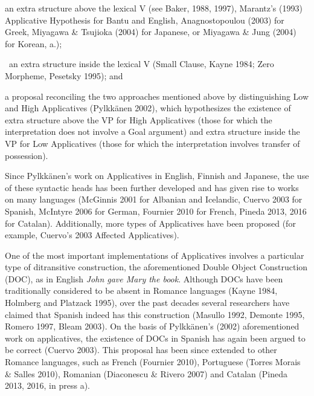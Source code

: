 \setcounter{listWWviiiNumileveli}{0}
\begin{listWWviiiNumileveli}
\item 
\begin{styleBodyA}
an extra structure above the lexical V (see Baker, 1988, 1997), Marantz's (1993) Applicative Hypothesis for Bantu and English, Anagnostopoulou (2003) for Greek, Miyagawa \& Tsujioka (2004) for Japanese, or Miyagawa \& Jung (2004) for Korean, a.); 
\end{styleBodyA}
\item 
\begin{styleBodyA}
\ an extra structure inside the lexical V (Small Clause, Kayne 1984; Zero Morpheme, Pesetsky 1995); and
\end{styleBodyA}
\item 
\begin{styleBodyA}
a proposal reconciling the two approaches mentioned above by distinguishing Low and High Applicatives (Pylkkänen 2002), which hypothesizes the existence of extra structure above the VP for High Applicatives (those for which the interpretation does not involve a Goal argument) and extra structure inside the VP for Low Applicatives (those for which the interpretation involves transfer of possession). 
\end{styleBodyA}
\end{listWWviiiNumileveli}
\begin{stylePrrafodelista}
\textmd{Since Pylkkänen's work on Applicatives in English, Finnish and Japanese, the use of these syntactic heads has been further developed and has given rise to works on many languages (McGinnis 2001 for Albanian and Icelandic, Cuervo 2003 for Spanish, McIntyre 2006 for German, Fournier 2010 for French, Pineda 2013, 2016 for Catalan). Additionally, more types of Applicatives have been proposed (for example, Cuervo’s 2003 Affected Applicatives).~}
\end{stylePrrafodelista}

\begin{stylePrrafodelista}
\textmd{One of the most important implementations of Applicatives involves a particular type of ditransitive construction, the aforementioned Double Object Construction (DOC), as in English }\textmd{\textit{John gave Mary the book}}\textmd{. Although DOCs have been traditionally considered to be absent in Romance languages (Kayne 1984, Holmberg and Platzack 1995), over the past decades several researchers have claimed that Spanish indeed has this construction (Masullo 1992, Demonte 1995, Romero 1997, Bleam 2003). On the basis of Pylkkänen's (2002) aforementioned work on applicatives, the existence of DOCs in Spanish has again been argued to be correct (Cuervo 2003). This proposal has been since extended to other Romance languages, such as French (Fournier 2010), Portuguese (Torres Morais \& Salles 2010), Romanian (Diaconescu \& Rivero 2007) and Catalan (Pineda 2013, 2016, in press a). }
\end{stylePrrafodelista}

